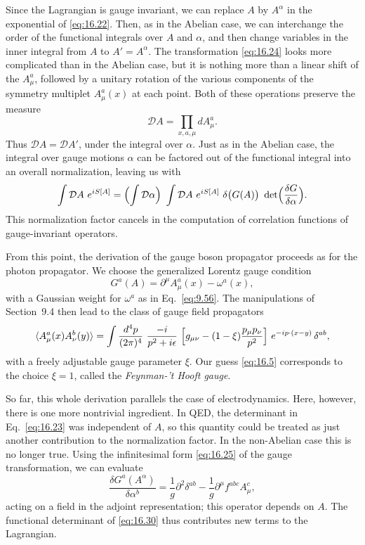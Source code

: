 Since the Lagrangian is gauge invariant, we can replace $A$ by $A^\alpha$ in
the exponential of \eqref{eq:16.22}.  Then, as in the Abelian case, we can
interchange the order of the functional integrals over $A$ and $\alpha$, and
then change variables in the inner integral from $A$ to $A' = A^\alpha$.  The
transformation \eqref{eq:16.24} looks more complicated than in the Abelian
case, but it is nothing more than a linear shift of the $A^a_\mu$, followed by
a unitary rotation of the various components of the symmetry multiplet
$A^a_\mu(x)$ at each point.  Both of these operations preserve the measure
\begin{equation}
  \mathcal{D}A = \prod_{x,a,\mu} dA^a_\mu .
  \label{eq:16.26}
\end{equation}
Thus $\mathcal{D}A = \mathcal{D}A'$, under the integral over $\alpha$.  Just
as in the Abelian case, the integral over gauge motions $\alpha$ can be
factored out of the functional integral into an overall normalization, leaving
us with
\begin{equation}
  \int \mathcal{D}A\ e^{iS[A]} = \Bigl( \int \mathcal{D}\alpha \Bigr)\
    \int \mathcal{D}A\ e^{iS[A]}\ \delta\bigl( G(A) \bigr)\ \det\Bigl(
      \frac{\delta G}{\delta\alpha} \Bigr) .
  \label{eq:16.27}
\end{equation}
This normalization factor cancels in the computation of correlation functions
of gauge-invariant operators.

From this point, the derivation of the gauge boson propagator proceeds as for
the photon propagator.  We choose the generalized Lorentz gauge condition
\begin{equation}
  G^a(A) = \partial^\mu A^a_\mu(x) - \omega^a(x) ,
  \label{eq:16.28}
\end{equation}
with a Gaussian weight for $\omega^a$ as in Eq.~\eqref{eq:9.56}.  The
manipulations of Section~9.4 then lead to the class of gauge field
propagators
\begin{equation}
  \langle A^a_\mu(x)A^b_\nu(y)\rangle = \int \frac{d^4p}{(2\pi)^4}\
    \frac{-i}{p^2+i\epsilon}\ \Bigl[ g_{\mu\nu} - (1-\xi)\frac{p_\mu p_\nu}
      {p^2} \Bigr]\ e^{-ip\cdot(x-y)}\,\delta^{ab} ,
  \label{eq:16.29}
\end{equation}
with a freely adjustable gauge parameter $\xi$.  Our guess \eqref{eq:16.5}
corresponds to the choice $\xi = 1$, called the \emph{Feynman-'t Hooft
gauge}.

So far, this whole derivation parallels the case of electrodynamics.  Here,
however, there is one more nontrivial ingredient.  In QED, the determinant in
Eq.~\eqref{eq:16.23} was independent of $A$, so this quantity could be
treated as just another contribution to the normalization factor.  In the
non-Abelian case this is no longer true.  Using the infinitesimal form
\eqref{eq:16.25} of the gauge transformation, we can evaluate
\begin{equation}
  \frac{\delta G^a(A^\alpha)}{\delta\alpha^b} = \frac{1}{g}\partial^2\delta^{ab}
    - \frac{1}{g}\partial^\mu f^{abc}A^c_\mu ,
  \label{eq:16.30}
\end{equation}
acting on a field in the adjoint representation; this operator depends on
$A$.  The functional determinant of \eqref{eq:16.30} thus contributes new
terms to the Lagrangian.

